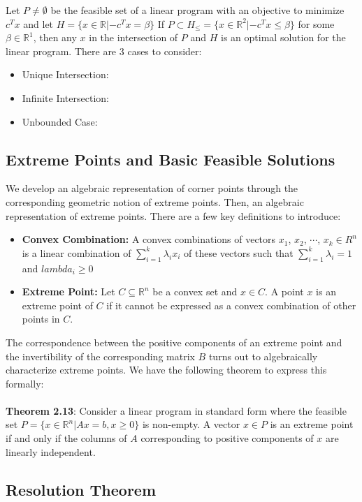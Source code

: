 \documentclass[11pt]{article}
\newcommand{\R}{\mathbb{R}}
\begin{document}
Let $P \neq \emptyset$ be the feasible set of a linear program with an objective to minimize $c^Tx$ and let $H= \{ x \in \R | -c^Tx = \beta \}$ If $P \subset H_{\leq} = \{x \in \R^2|-c^Tx \leq \beta \}$ for some $\beta \in \R^1$, then any $x$ in the intersection of $P$ and $H$ is an optimal solution for the linear program. There are 3 cases to consider:
\begin{itemize}
\item Unique Intersection:
\item Infinite Intersection:
\item Unbounded Case:
\end{itemize}

\subsection{Extreme Points and Basic Feasible Solutions}
We develop an algebraic representation of corner points through the corresponding geometric notion of extreme points. Then, an algebraic representation of extreme points. There are a few key definitions to introduce: 
\begin{itemize}
\item \textbf{Convex Combination:} A convex combinations of vectors $x_1$, $x_2$, $\cdots$, $x_k \in R^n$ is a linear combination of $\sum_{i=1}^k \lambda_i x_i$ of these vectors such that $\sum_{i=1}^k \lambda_i =1 $ and $lambda_i \geq 0 $
\item \textbf{Extreme Point: }Let $C\subseteq \R^n$ be a convex set and $x \in C$. A point $x$ is an extreme point of $C$ if it cannot be expressed as a convex combination of other points in $C$.
\end{itemize}
The correspondence between the positive components of an extreme point and the invertibility of the corresponding matrix $B$ turns out to algebraically characterize extreme points. We have the following theorem to express this formally:  \\ \\
\textbf{Theorem 2.13}: Consider a linear program in standard form where the feasible set $P = \{x \in \R^n|Ax = b,x \geq 0 \}$ is non-empty. A vector $x \in P$ is an extreme point if and only if the columns of $A$ corresponding to positive components of $x$ are linearly independent.

\subsection{Resolution Theorem}
\end{document}
